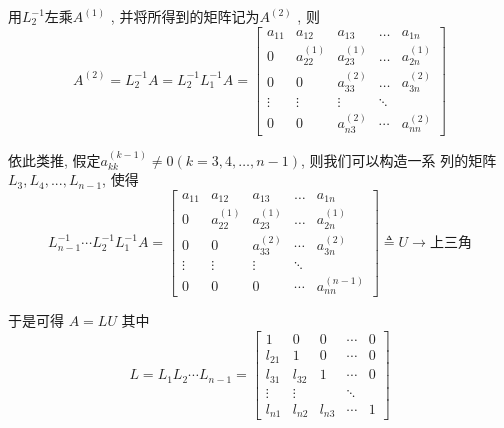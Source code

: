 \documentclass[12pt,a4paper]{article}
\begin{document}
用$L_{2}^{-1}$左乘$A^{(1)}$
, 并将所得到的矩阵记为$A^{(2)}$
, 则
$$
A^{(2)}=L_{2}^{-1} A=L_{2}^{-1} L_{1}^{-1}A=\left[\begin{array}{ccccc}{a_{11}} & {a_{12}} & {a_{13}} & {\dots} &{a_{1 n}} \\ {0} & {a_{22}^{(1)}} & {a_{23}^{(1)}} & {\dots} & {a_{2 n}^{(1)}} \\ {0} & {0} & {a_{33}^{(2)}} & {\dots} & {a_{3 n}^{(2)}} \\ {\vdots} & {\vdots} & {\vdots} & {\ddots} &{ } \\ {0} & {0} & {a_{n 3}^{(2)}} & {\cdots} & {a_{n n}^{(2)}}\end{array}\right]
$$

依此类推, 假定$a_{k k}^{(k-1)} \neq 0(k=3,4, \dots, n-1)$, 则我们可以构造一系
列的矩阵$ L_3, L_4, . . . , L_{n−1}$, 使得
$$
L_{n-1}^{-1} \cdots L_{2}^{-1} L_{1}^{-1} A=\left[\begin{array}{ccccc}{a_{11}} & {a_{12}} & {a_{13}} & {\dots} & {a_{1 n}} \\ {0} & {a_{22}^{(1)}} & {a_{23}^{(1)}} & {\dots} & {a_{2 n}^{(1)}} \\ {0} & {0} & {a_{33}^{(2)}} & {\cdots} & {a_{3 n}^{(2)}} \\ {\vdots} & {\vdots} & {\vdots} & {\ddots} \\ {0} & {0} & {0} & {\cdots} & {a_{n n}^{(n-1)}}\end{array}\right] \triangleq U \rightarrow \text{上三角}
$$

于是可得 $A = LU$ 其中
$$
L=L_{1} L_{2} \cdots L_{n-1}=\left[\begin{array}{ccccc}{1} & {0} & {0} & {\cdots} &{0}\\ {l_{21}} & {1} & {0} & {\cdots} &{0}\\ {l_{31}} & {l_{32}} & {1} & {\cdots} &{0}\\ {\vdots} & {\vdots} & { }& {\ddots} & { }\\ {l_{n 1}} & {l_{n 2}} & {l_{n 3}} & {\cdots} &{1}\end{array}\right]
$$
\end{document}
